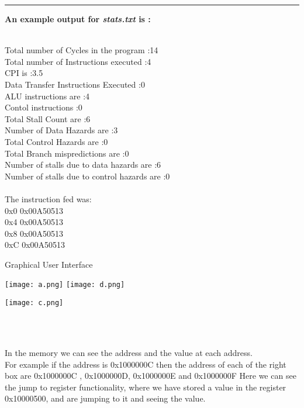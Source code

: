 \documentclass{article}
\begin{document}
\par\noindent\rule{\textwidth}{0.4pt}



\noindent
\textbf{An example output for \textsl{stats.txt} is :}\\
\\
\begin{LARGE}
\textsf{Total number of Cycles in the program :14}\\
\textsf{Total number of Instructions executed :4}\\
\textsf{CPI is :3.5}\\
\textsf{Data Transfer Instructions Executed :0}\\
\textsf{ALU instructions are :4}\\
\textsf{Contol instructions :0}\\
\textsf{Total Stall Count are :6}\\
\textsf{Number of Data Hazards are :3}\\
\textsf{Total Control Hazards are :0}\\
\textsf{Total Branch mispredictions are :0}\\
\textsf{Number of stalls due to data hazards are :6}\\
\textsf{Number of stalls due to control hazards are :0}\\\\
\textsf{The instruction fed was:}\\
\textsf{0x0	0x00A50513}\\
\textsf{0x4	0x00A50513}\\
\textsf{0x8	0x00A50513}\\
\textsf{0xC	0x00A50513}\\
\end{LARGE}
\vspace{0.6cm}

\noindent
\newpage
\begin{centering}
\begin{Huge}
\textsf{Graphical User Interface}\\
\end{Huge}
\vspace{1cm}
\texttt{[image: a.png]}\vspace{2cm}
\texttt{[image: d.png]}
\newpage

\begin{centering}
\texttt{[image: c.png]}
\end{centering}
\\\\
\end{centering}
\vspace{3cm}
\LARGE
In the memory we can see the address and the value at each address. \\
For example if the address is 0x1000000C then the address of each of the right box are 0x1000000C , 0x1000000D, 0x1000000E and 0x1000000F
Here we can see the jump to register functionality, where we have stored a value in the register 0x10000500, and are jumping to it and seeing the value.\\
\end{document}
